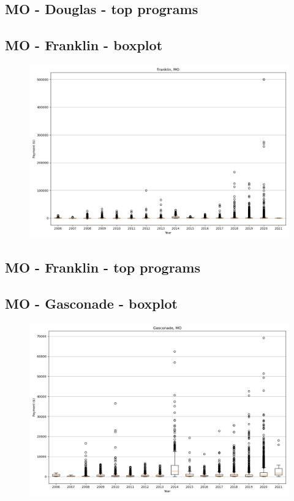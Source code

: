\subsection*{MO - Douglas - top programs}

\newpage
\subsection*{MO - Franklin - boxplot}
\begin{figure}[h]
\centering
\includegraphics[width=7in]{../output/boxplots/counties/Franklin-MO_boxplot.png}
\end{figure}


\subsection*{MO - Franklin - top programs}

\newpage
\subsection*{MO - Gasconade - boxplot}
\begin{figure}[h]
\centering
\includegraphics[width=7in]{../output/boxplots/counties/Gasconade-MO_boxplot.png}
\end{figure}


